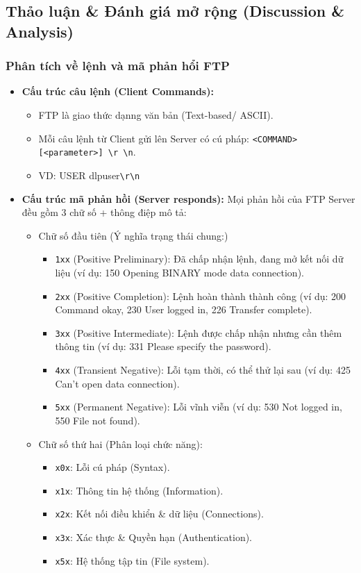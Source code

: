 \documentclass[12pt,a4paper]{article}
\begin{document}
\subsection{Thảo luận \& Đánh giá mở rộng (Discussion \& Analysis)}
\subsubsection{Phân tích về lệnh và mã phản hổi FTP}
\begin{itemize}
  \item \textbf{Cấu trúc câu lệnh (Client Commands):}
    \begin{itemize}
      \item FTP là giao thức dạnng văn bản (Text-based/ ASCII).
      \item Mỗi câu lệnh từ Client gửi lên Server có cú pháp: \texttt{<COMMAND> [<parameter>] \textbackslash r \textbackslash n}.
      \item VD: USER dlpuser\texttt{\textbackslash r\textbackslash n}
    \end{itemize}
  \item \textbf{Cấu trúc mã phản hồi (Server responds):}
    Mọi phản hồi của FTP Server đều gồm 3 chữ số + thông điệp mô tả:
    \begin{itemize}
      \item Chữ số đầu tiên (Ý nghĩa trạng thái chung:)
        \begin{itemize}
          \item \texttt{1xx} (Positive Preliminary): Đã chấp nhận lệnh, đang mở kết nối dữ liệu (ví dụ: 150 Opening BINARY mode data connection).
          \item \texttt{2xx} (Positive Completion): Lệnh hoàn thành thành công (ví dụ: 200 Command okay, 230 User logged in, 226 Transfer complete).
          \item \texttt{3xx} (Positive Intermediate): Lệnh được chấp nhận nhưng cần thêm thông tin (ví dụ: 331 Please specify the password).
          \item \texttt{4xx} (Transient Negative): Lỗi tạm thời, có thể thử lại sau (ví dụ: 425 Can't open data connection).
          \item \texttt{5xx} (Permanent Negative): Lỗi vĩnh viễn (ví dụ: 530 Not logged in, 550 File not found).
        \end{itemize}
      \item Chữ số thứ hai (Phân loại chức năng):
        \begin{itemize}
          \item \texttt{x0x}: Lỗi cú pháp (Syntax).
          \item \texttt{x1x}: Thông tin hệ thống (Information).
          \item \texttt{x2x}: Kết nối điều khiển \& dữ liệu (Connections).
          \item \texttt{x3x}: Xác thực \& Quyền hạn (Authentication).
          \item \texttt{x5x}: Hệ thống tập tin (File system).
        \end{itemize}
    \end{itemize}
\end{itemize}
\end{document}
